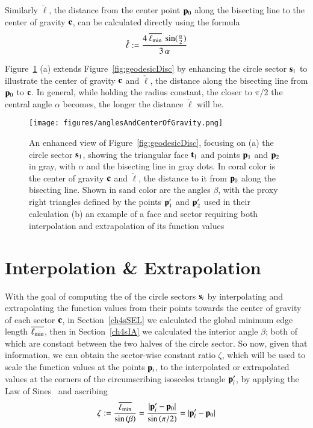 Similarly $\check{\ell}$, the distance from the center point $\mathbf{p}_0$ along the bisecting line to the center of gravity $\mathbf{c}$, can be calculated directly using the formula
%
\begin{equation}
	\check{\ell} := \frac{4\:\overline{\ell_\text{min}}\:\sin(\frac{\alpha}{2})}{3\,\alpha}
	\label{eq:distToCoG}
\end{equation}%

Figure~\ref{fig:anglesAndCenterOfGravity} (a) extends Figure~\ref{fig:geodesicDisc} by enhancing the circle sector $\mathbf{s}_1$ to illustrate the center of gravity $\mathbf{c}$ and $\check{\ell}$, the distance along the bisecting line from $\mathbf{p}_0$ to $\mathbf{c}$. In general, while holding the radius constant, the closer to $\pi/2$ the central angle $\alpha$ becomes, the longer the distance $\check{\ell}$ will be.

\begin{figure}[ht]
\ffigbox
	{\texttt{[image: figures/anglesAndCenterOfGravity.png]}}
	{\caption[Angles and Center of Gravity]{An enhanced view of Figure~\ref{fig:geodesicDisc}, focusing on (a) the circle sector $\mathbf{s}_1$, showing the triangular face $\mathbf{t}_1$ and points $\mathbf{p}_1$ and $\mathbf{p}_2$ in gray, with $\alpha$ and the bisecting line in gray dots. In coral color is the center of gravity $\mathbf{c}$ and $\check{\ell}$, the distance to it from $\mathbf{p}_0$ along the bisecting line. Shown in sand color are the angles $\beta$, with the proxy right triangles defined by the points $\mathbf{p}'_1$ and $\mathbf{p}'_2$ used in their calculation (b) an example of a face and sector requiring both interpolation and extrapolation of its function values}\label{fig:anglesAndCenterOfGravity}}
\end{figure}%

%
%
%
%
\section{Interpolation \& Extrapolation}
\label{ch4sIE}
With the goal of computing the  of the circle sectors $\mathbf{s}_i$ by interpolating and extrapolating the function values from their points towards the center of gravity of each sector $\mathbf{c}$, in Section~\ref{ch4sSEL} we calculated the global minimum edge length $\overline{\ell_\text{min}}$, then in Section~\ref{ch4sIA} we calculated the interior angle $\beta$; both of which are constant between the two halves of the circle sector. So now, given that information, we can obtain the sector-wise constant ratio $\zeta$, which will be used to scale the function values at the points $\mathbf{p}_i$, to the interpolated or extrapolated values at the corners of the circumscribing isosceles triangle $\mathbf{p}'_i$, by applying the Law of Sines~\cite{Weisstein19g} and ascribing
%
\begin{equation}
	\zeta := \frac{\overline{\ell_\text{min}}}{\sin\left (\beta\right )} = \frac{|\mathbf{p}'_i - \mathbf{p}_0|}{\sin\left (\pi/2\right )} = |\mathbf{p}'_i - \mathbf{p}_0|
	\label{eq:zeta}
\end{equation}%
%

